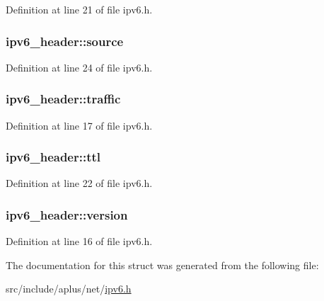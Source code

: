 Definition at line 21 of file ipv6.\+h.

\hypertarget{structipv6__header_a1ad13965e74030de39800b8208b81d50}{
\subsubsection[{source}]{ ipv6\+\_\+header\+::source}}\label{structipv6__header_a1ad13965e74030de39800b8208b81d50}


Definition at line 24 of file ipv6.\+h.

\hypertarget{structipv6__header_a606cd7e1d19fc609e648d88aabcd7b55}{
\subsubsection[{traffic}]{ ipv6\+\_\+header\+::traffic}}\label{structipv6__header_a606cd7e1d19fc609e648d88aabcd7b55}


Definition at line 17 of file ipv6.\+h.

\hypertarget{structipv6__header_a33bb04e114be3a3e1d5dd2c360bc4844}{
\subsubsection[{ttl}]{ ipv6\+\_\+header\+::ttl}}\label{structipv6__header_a33bb04e114be3a3e1d5dd2c360bc4844}


Definition at line 22 of file ipv6.\+h.

\hypertarget{structipv6__header_acf470d4fdf8b7215b3a2b02b0bf030b6}{
\subsubsection[{version}]{ ipv6\+\_\+header\+::version}}\label{structipv6__header_acf470d4fdf8b7215b3a2b02b0bf030b6}


Definition at line 16 of file ipv6.\+h.



The documentation for this struct was generated from the following file\+:\begin{DoxyCompactItemize}
\item 
src/include/aplus/net/\hyperlink{ipv6_8h}{ipv6.\+h}\end{DoxyCompactItemize}
